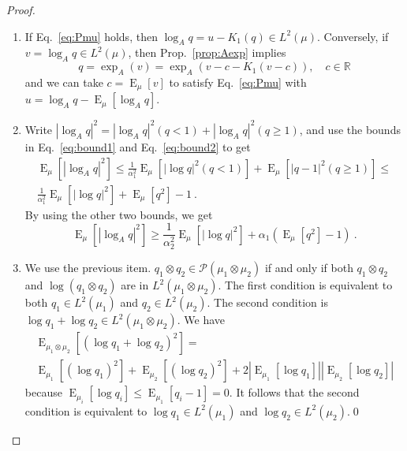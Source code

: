 \documentclass[graybox]{svmult}
\DeclareMathOperator{\Expectation}{E}
\newcommand{\absoluteval}[1]{\left\vert#1\right\vert}
\newcommand{\expectat}[2]{{\Expectation}_{#1}\left[#2\right]}
\newcommand{\reals}{\mathbb{R}}
\begin{document}
\begin{proof}
  \begin{enumerate}
  \item 
If Eq.~\eqref{eq:Pmu} holds, then $\log_A q = u - K_1(q) \in L^2(\mu)$. Conversely, if $v = \log _{A}q\in L^{2}(\mu )$, then Prop.~\eqref{prop:Aexp} implies
\begin{equation*}
  q = \exp_A(v) = \exp_A(v - c - K_1(v-c)), \quad c \in \reals
\end{equation*}
and we can take $c = \expectat \mu v$ to satisfy Eq.~\eqref{eq:Pmu} with $u = \log_A q - \expectat \mu {\log_A q}$.
\item Write $\absoluteval {\log_A q}^2 = \absoluteval{\log_A q}^2 (q < 1) + \absoluteval{\log_A q}^2 (q \geq 1)$, and use the bounds in Eq.~\eqref{eq:bound1} and Eq.~\eqref{eq:bound2} to get
\begin{multline*}
  \expectat \mu {\absoluteval {\log_A q}^2} \le \frac1{\alpha_1^2}\expectat \mu {\absoluteval{\log q}^2 (q < 1)} + \expectat \mu {\absoluteval{q-1}^2 (q \geq 1)} \leq \\ \frac1{\alpha_1^2} \expectat \mu {\absoluteval{\log q}^2} + \expectat \mu {q^2} -1 \ .
\end{multline*}
By using the other two bounds, we get
\begin{equation*}
  \expectat \mu {\absoluteval {\log_A q}^2} \ge \frac1{\alpha_2^2} \expectat \mu {\absoluteval{\log q}^2} + \alpha_1(\expectat \mu {q^2} - 1) \ .
\end{equation*}
\item We use the previous item. $q_1 \otimes q_2 \in \mathcal P(\mu_1 \otimes \mu_2)$ if and only if both $q_1 \otimes q_2$ and $\log (q_1 \otimes q_2)$ are in $L^2(\mu_1\otimes\mu_2)$. The first condition is equivalent to both $q_1 \in L^2(\mu_1)$ and $q_2 \in L^2(\mu_2)$. The second condition is $\log q_1 + \log q_2 \in L^2(\mu_1\otimes\mu_2)$. We have
\begin{multline*}
  \expectat {\mu_1 \otimes \mu_2}{(\log q_1 + \log q_2)^2} = \\ \expectat {\mu_1}{(\log q_1)^2} + \expectat {\mu_2}{(\log q_2)^2} + 2 \absoluteval{\expectat {\mu_1} {\log q_1}} \absoluteval{\expectat {\mu_2} {\log q_2}}
\end{multline*}
because $\expectat {\mu_i} {\log q_i} \le \expectat {\mu_1} {q_i-1} = 0$. It follows that the second condition is equivalent to $\log q_1 \in L^2(\mu_1)$ and $\log  q_2 \in L^2(\mu_2)$.\qed
\end{enumerate}
\end{proof}
\end{document}
